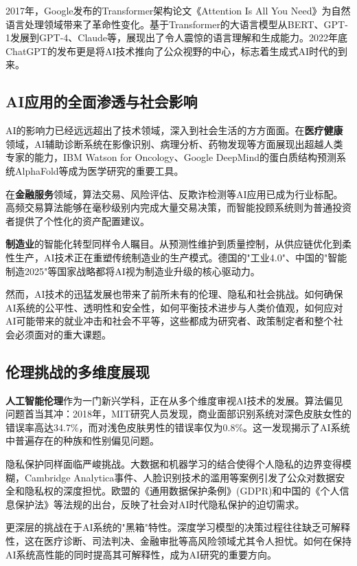 2017年，Google发布的Transformer架构论文《Attention Is All You Need》为自然语言处理领域带来了革命性变化。基于Transformer的大语言模型从BERT、GPT-1发展到GPT-4、Claude等，展现出了令人震惊的语言理解和生成能力。2022年底ChatGPT的发布更是将AI技术推向了公众视野的中心，标志着生成式AI时代的到来。

\subsection{AI应用的全面渗透与社会影响}

AI的影响力已经远远超出了技术领域，深入到社会生活的方方面面。在{\bf 医疗健康}领域，AI辅助诊断系统在影像识别、病理分析、药物发现等方面展现出超越人类专家的能力，IBM Watson for Oncology、Google DeepMind的蛋白质结构预测系统AlphaFold等成为医学研究的重要工具。

在{\bf 金融服务}领域，算法交易、风险评估、反欺诈检测等AI应用已成为行业标配。高频交易算法能够在毫秒级别内完成大量交易决策，而智能投顾系统则为普通投资者提供了个性化的资产配置建议。

{\bf 制造业}的智能化转型同样令人瞩目。从预测性维护到质量控制，从供应链优化到柔性生产，AI技术正在重塑传统制造业的生产模式。德国的"工业4.0"、中国的"智能制造2025"等国家战略都将AI视为制造业升级的核心驱动力。

然而，AI技术的迅猛发展也带来了前所未有的伦理、隐私和社会挑战。如何确保AI系统的公平性、透明性和安全性，如何平衡技术进步与人类价值观，如何应对AI可能带来的就业冲击和社会不平等，这些都成为研究者、政策制定者和整个社会必须面对的重大课题。

\subsection{伦理挑战的多维度展现}

{\bf 人工智能伦理}作为一门新兴学科，正在从多个维度审视AI技术的发展。算法偏见问题首当其冲：2018年，MIT研究人员发现，商业面部识别系统对深色皮肤女性的错误率高达34.7\%，而对浅色皮肤男性的错误率仅为0.8\%。这一发现揭示了AI系统中普遍存在的种族和性别偏见问题。

隐私保护同样面临严峻挑战。大数据和机器学习的结合使得个人隐私的边界变得模糊，Cambridge Analytica事件、人脸识别技术的滥用等案例引发了公众对数据安全和隐私权的深度担忧。欧盟的《通用数据保护条例》(GDPR)和中国的《个人信息保护法》等法规的出台，反映了社会对AI时代隐私保护的迫切需求。

更深层的挑战在于AI系统的"黑箱"特性。深度学习模型的决策过程往往缺乏可解释性，这在医疗诊断、司法判决、金融审批等高风险领域尤其令人担忧。如何在保持AI系统高性能的同时提高其可解释性，成为AI研究的重要方向。

